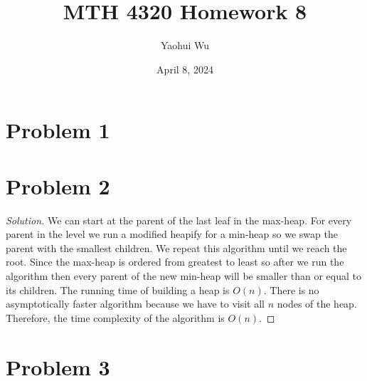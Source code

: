 \documentclass[12pt]{article}
\title{MTH 4320 Homework 8}
\author{Yaohui Wu}
\date{April 8, 2024}
\newenvironment*{solution}{\begin{proof}[Solution]}{\end{proof}}
\begin{document}
\maketitle
\section*{Problem 1}
\section*{Problem 2}
\begin{solution}
    We can start at the parent of the last leaf in the max-heap. For every
    parent in the level we run a modified heapify for a min-heap so we swap
    the parent with the smallest children. We repeat this algorithm until we
    reach the root. Since the max-heap is ordered from greatest to least so
    after we run the algorithm then every parent of the new min-heap will be
    smaller than or equal to its children. The running time of building a heap
    is \(O(n)\). There is no asymptotically faster algorithm because we have
    to visit all \(n\) nodes of the heap. Therefore, the time complexity of
    the algorithm is \(O(n)\).
\end{solution}
\section*{Problem 3}
\end{document}
